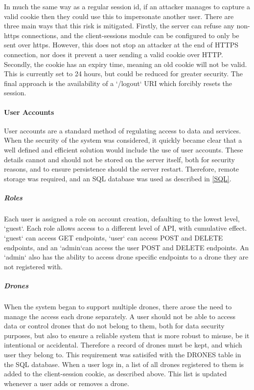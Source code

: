 \documentclass{article}
\begin{document}
In much the same way as a regular session id, if an attacker manages to capture a valid cookie then they could use this to impersonate another user. There are three main ways that this risk is mitigated. Firstly, the server can refuse any non-https connections, and the client-sessions module can be configured to only be sent over https. However, this does not stop an attacker at the end of HTTPS connection, nor does it prevent a user sending a valid cookie over HTTP. Secondly, the cookie has an expiry time, meaning an old cookie will not be valid. This is currently set to 24 hours, but could be reduced for greater security\cite{mozillaClientSessions}. The final approach is the availability of a `/logout` URI which forcibly resets the session. 


\paragraph{User Accounts}
User accounts are a standard method of regulating access to data and services. When the security of the system was considered, it quickly became clear that a well defined and efficient solution would include the use of user accounts. These details cannot and should not be stored on the server itself, both for security reasons, and to ensure persistence should the server restart. Therefore, remote storage was required, and an SQL database was used as described in \ref{SQL}.

\subparagraph{Roles}
Each user is assigned a role on account creation, defaulting to the lowest level, `guest`. Each role allows access to a different level of API, with cumulative effect. `guest` can access GET endpoints, `user` can access POST and DELETE endpoints, and an `admin`can access the user POST and DELETE endpoints. An `admin` also has the ability to access drone specific endpoints to a drone they are not registered with. 

\subparagraph{Drones}
When the system began to support multiple drones, there arose the need to manage the access each drone separately. A user should not be able to access data or control drones that do not belong to them, both for data security purposes, but also to ensure a reliable system that is more robust to misuse, be it intentional or accidental. Therefore a record of drones must be kept, and which user they belong to. This requirement was satisifed with the DRONES table in the SQL database. When a user logs in, a list of all drones registered to them is added to the client-session cookie, as described above. This list is updated whenever a user adds or removes a drone. 
\end{document}
